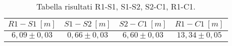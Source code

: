 \begin{table}[H]
    \centering
        \begin{tabular}{|c|c|c|c|}
        \hline
        $ R1-S1~[m] $ & $ S1-S2~[m] $ & $ S2-C1~[m] $ & $ R1-C1~[m] $\\
        \hline
        $ 6,09 \pm 0,03 $ & $ 0,66 \pm 0,03 $ & $ 6,60 \pm 0,03 $ & $ 13,34 \pm 0,05 $\\
        \hline
        \end{tabular}
    \caption{Tabella risultati R1-S1, S1-S2, S2-C1, R1-C1.}
\end{table}